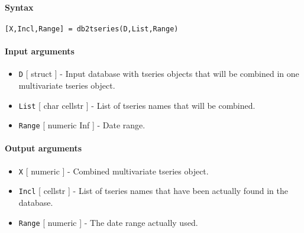 


	\paragraph{Syntax}

\begin{verbatim}
[X,Incl,Range] = db2tseries(D,List,Range)
\end{verbatim}

\paragraph{Input arguments}

\begin{itemize}
\item
  \texttt{D} {[} struct {]} - Input database with tseries objects that
  will be combined in one multivariate tseries object.
\item
  \texttt{List} {[} char \textbar{} cellstr {]} - List of tseries names
  that will be combined.
\item
  \texttt{Range} {[} numeric \textbar{} Inf {]} - Date range.
\end{itemize}

\paragraph{Output arguments}

\begin{itemize}
\item
  \texttt{X} {[} numeric {]} - Combined multivariate tseries object.
\item
  \texttt{Incl} {[} cellstr {]} - List of tseries names that have been
  actually found in the database.
\item
  \texttt{Range} {[} numeric {]} - The date range actually used.
\end{itemize}


